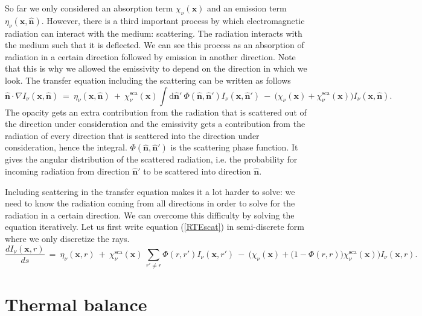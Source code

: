 \documentclass[]{article}
\begin{document}
So far we only considered an absorption term $\chi_{\nu}(\textbf{x})$ and an emission term $\eta_{\nu}(\textbf{x},\hat{\textbf{n}})$. However, there is a third important process by which electromagnetic radiation can interact with the medium: scattering. The radiation interacts with the medium such that it is deflected. We can see this process as an absorption of radiation in a certain direction followed by emission in another direction. Note that this is why we allowed the emissivity to depend on the direction in which we look. The transfer equation including the scattering can be written as follows
\begin{equation}
\hat{\textbf{n}} \cdot \nabla I_{\nu}(\textbf{x},\hat{\textbf{n}}) \ = \ \eta_{\nu}(\textbf{x},\hat{\textbf{n}}) \ + \ \chi_{\nu}^{\text{sca}}(\textbf{x}) \int \text{d} \hat{\textbf{n}}' \ \Phi(\hat{\textbf{n}},\hat{\textbf{n}}') I_{\nu}(\textbf{x},\hat{\textbf{n}}') \ - \ \big( \chi_{\nu}(\textbf{x}) + \chi_{\nu}^{\text{sca}}(\textbf{x}) \big) I_{\nu}(\textbf{x},\hat{\textbf{n}}).
\label{RTEscat}
\end{equation}
The opacity gets an extra contribution from the radiation that is scattered out of the direction under consideration and the emissivity gets a contribution from the radiation of every direction that is scattered into the direction under consideration, hence the integral. $\Phi(\hat{\textbf{n}},\hat{\textbf{n}}')$ is the scattering phase function. It gives the angular distribution of the scattered radiation, i.e. the probability for incoming radiation from direction $\hat{\textbf{n}}'$ to be scattered into direction $\hat{\textbf{n}}$.

\bigskip

Including scattering in the transfer equation makes it a lot harder to solve: we need to know the radiation coming from all directions in order to solve for the radiation in a certain direction. We can overcome this difficulty by solving the equation iteratively. Let us first write equation (\ref{RTEscat}) in semi-discrete form where we only discretize the rays.
\begin{equation}
\frac{d I_{\nu}(\textbf{x},r)}{ds} \ = \ \eta_{\nu}(\textbf{x},r) \ + \ \chi_{\nu}^{\text{sca}}(\textbf{x}) \ \sum_{r' \neq r} \Phi(r,r') I_{\nu}(\textbf{x},r') \ - \ \Big( \chi_{\nu}(\textbf{x}) + \big( 1 - \Phi(r,r) \big) \chi_{\nu}^{\text{sca}}(\textbf{x}) \Big) I_{\nu}(\textbf{x},r).
\label{RTEscat}
\end{equation}


\section{Thermal balance}
\end{document}
